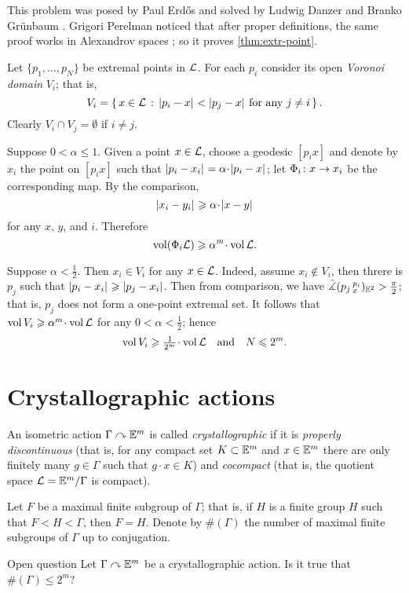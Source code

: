 This problem was posed by Paul Erd\H{o}s  \cite{erdos} and solved by Ludwig Danzer and Branko Gr\"unbaum \cite{danzer-gruenbaum}.
Grigori Perelman noticed that after proper definitions, the same proof works in Alexandrov spaces \cite{perelman-Erdos}; so it proves \ref{thm:extr-point}.

Let $\{p_1,\dots,p_N\}$ be extremal points in $\mathcal{L}$.
For each $p_i$ consider its open \emph{Voronoi domain} $V_i$; that is, 
\[V_i=\set{x\in \spc{L}}{\dist{p_i}{x}{}<\dist{p_j}{x}{}\ \text{for any}\ j\not=i}.\]
Clearly $V_i\cap V_j=\emptyset$ if $i\not=j$.

Suppose  $0<\alpha\le 1$.
Given a point $x\in\mathcal{L}$, choose a geodesic $[p_ix]$ and denote by $x_i$ the point on $[p_ix]$ such that $\dist{p_i}{x_i}{}=\alpha\cdot\dist{p_i}{x}{}$;
let $\Phi_i\colon x\to x_i$ be the corresponding map.
By the comparison, 
\[\dist{x_i}{y_i}{}\ge\alpha\cdot \dist{x}{y}{}\]
for any $x$, $y$, and $i$.
Therefore 
\[\vol(\map_i \spc{L})\ge\alpha^m\cdot\vol \spc{L}.\]

Suppose $\alpha<\tfrac12$.
Then $x_i\in V_i$ for any $x\in \mathcal{L}$.
Indeed, assume $x_i\notin V_i$,
then threre is $p_j$ such that $\dist{p_i}{x_i}{}\ge\dist{p_j}{x_i}{}$.
Then from comparison, we have $\tilde\measuredangle(p_j\,{}^{p_i}_{x})_{\mathbb{E}^2}>\tfrac\pi2$;
that is, $p_j$ does not form a one-point extremal set.
It follows that $\vol V_i\ge\alpha^m\cdot\vol \spc{L}$
for any $0<\alpha<\tfrac12$; hence 
\[\vol V_i\ge\tfrac1{2^m}\cdot\vol \spc{L}\quad\text{and}\quad N\le 2^m.\]
\qedsf

\section{Crystallographic actions}


An isometric action $\Gamma\curvearrowright \mathbb{E}^m$ is called \emph{crystallographic} if it is 
\emph{properly discontinuous} (that is, for any compact set $K\subset \mathbb{E}^m$ and $x\z\in \EE^m$ there are only finitely many $g\in \Gamma$ such that $g\cdot x\in K$) and \emph{cocompact} (that is, the quotient space $\mathcal{L}=\mathbb{E}^m/\Gamma$ is compact).

Let $F$ be a maximal finite subgroup of $\Gamma$;
that is, if $H$ is a finite group $H$ such that $F<H<\Gamma$, then $F=H$.
Denote by $\#(\Gamma)$ the number of maximal finite subgroups of $\Gamma$ up to conjugation.

\begin{thm}{Open question}
Let $\Gamma\curvearrowright \mathbb{E}^m$ be a crystallographic action.
Is it true that $\#(\Gamma)\le 2^m$?
\end{thm}

